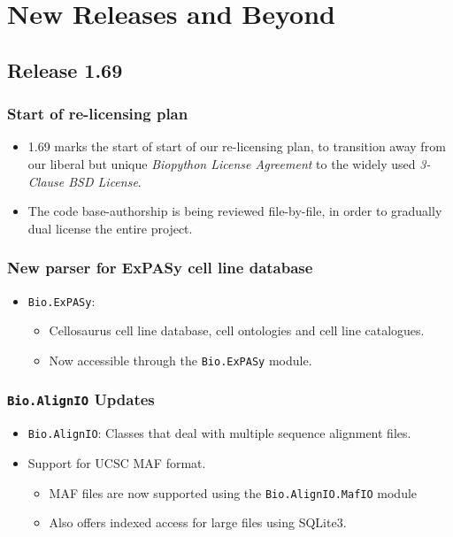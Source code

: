 \documentclass[trans]{beamer}
\begin{document}

\section{New Releases and Beyond}
\subsection*{Release 1.69}
\frame
{
}

\frame
{
  \frametitle{Start of re-licensing plan}
  
  \begin{itemize}
  \item 1.69 marks the start of start of our re-licensing plan, to transition away
from our liberal but unique \emph{Biopython License Agreement} to the widely used \emph{3-Clause BSD License}.
\item The code base-authorship is being reviewed file-by-file, in order to gradually dual license the entire
project.
  \end{itemize}
  
}

\frame
{
  \frametitle{New parser for ExPASy cell line database}
  
  \begin{itemize}
  \item \texttt{Bio.ExPASy}:  
  \begin{itemize}
  \item Cellosaurus cell line database, cell ontologies and cell line catalogues.
  \item Now accessible through the \texttt{Bio.ExPASy} module.
  \end{itemize}
  \end{itemize}
  
  
}

\frame
{
  \frametitle{\texttt{Bio.AlignIO} Updates}
  
  \begin{itemize}
  \item \texttt{Bio.AlignIO}: Classes that deal with multiple sequence alignment files.
  \item Support for UCSC MAF format.
  \begin{itemize}
  \item MAF files are now supported using the \texttt{Bio.AlignIO.MafIO} module
  \item Also offers indexed access for large files using SQLite3.
  \end{itemize}
  \end{itemize}
}
\end{document}
